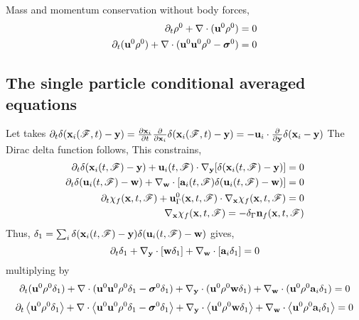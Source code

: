 Mass and momentum conservation without body forces, 
\begin{align*}
    \partial_t \rho^0 + \mathbf{\nabla}\cdot(\textbf{u}^0 \rho^0 ) = 0 \\
    \partial_t (\textbf{u}^0 \rho^0) + \mathbf{\nabla}\cdot(\textbf{u}^0 \textbf{u}^0 \rho^0 - \bm\sigma^0) = 0 \\
\end{align*}

\subsection*{The single particle conditional averaged equations}
Let takes 
$\partial_t \delta(\textbf{x}_i(\mathscr{F},t) - \textbf{y}) 
= \frac{\partial \textbf{x}_i}{\partial t} \frac{\partial }{\partial \textbf{x}_i} \delta(\textbf{x}_i(\mathscr{F},t) - \textbf{y})
= - \textbf{u}_i \cdot \frac{\partial }{\partial \textbf{y}} \delta(\textbf{x}_i - \textbf{y})$
The Dirac delta function follows, This constrains,
\begin{align*}
    \partial_t \delta(\textbf{x}_i(t,\mathscr{F})  - \textbf{y})
    +\textbf{u}_i(t,\mathscr{F})  \cdot {\mathbf{\nabla}_\textbf{y}} [ \delta(\textbf{x}_i(t,\mathscr{F})  - \textbf{y})]
    = 0\\
    \partial_t \delta(\textbf{u}_i(t,\mathscr{F}) -\textbf{w})
    + {\mathbf{\nabla}_\textbf{w}} \cdot [\textbf{a}_i(t,\mathscr{F})  \delta(\textbf{u}_i(t,\mathscr{F})  - \textbf{w})]
    = 0\\
    \partial_t \chi_f(\textbf{x},t,\mathscr{F}) 
    + \textbf{u}_\Gamma^0(\textbf{x},t,\mathscr{F}) \cdot {\mathbf{\nabla}_\textbf{x}} \chi_f(\textbf{x},t,\mathscr{F}) = 0 \\
    {\mathbf{\nabla}_\textbf{x}} \chi_f(\textbf{x},t,\mathscr{F}) = - \delta_\Gamma \textbf{n}_f(\textbf{x},t,\mathscr{F})
\end{align*}
Thus, $\delta_1 =\sum_i \delta(\textbf{x}_i(t,\mathscr{F})  - \textbf{y})\delta(\textbf{u}_i(t,\mathscr{F}) -\textbf{w})$ gives,
\begin{equation*}
    \partial_t \delta_1 
    + {\mathbf{\nabla}_\textbf{y}}\cdot [\textbf{w} \delta_1 ]
    + {\mathbf{\nabla}_\textbf{w}}\cdot [\textbf{a}_i \delta_1 ]
    =0 
\end{equation*} 
multiplying by 
\begin{align*}
    \partial_t (\textbf{u}^0 \rho^0\delta_1) + \mathbf{\nabla}\cdot(\textbf{u}^0 \textbf{u}^0 \rho^0 \delta_1 - \bm\sigma^0\delta_1) 
    +{\mathbf{\nabla}_\textbf{y}}\cdot (\textbf{u}^0 \rho^0  \textbf{w}\delta_1)
    +{\mathbf{\nabla}_\textbf{w}}\cdot (\textbf{u}^0 \rho^0  \textbf{a}_i\delta_1) = 0 \\
\end{align*}
\begin{align*}
    \partial_t \left<\textbf{u}^0 \rho^0\delta_1\right> 
    + \mathbf{\nabla}\cdot\left<\textbf{u}^0 \textbf{u}^0 \rho^0 \delta_1 - \bm\sigma^0\delta_1\right>
    +{\mathbf{\nabla}_\textbf{y}}\cdot \left<\textbf{u}^0 \rho^0  \textbf{w}\delta_1\right>
    +{\mathbf{\nabla}_\textbf{w}}\cdot \left<\textbf{u}^0 \rho^0  \textbf{a}_i\delta_1\right> 
    = 0 \\
\end{align*}
